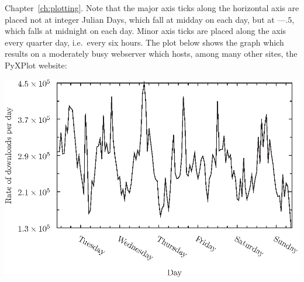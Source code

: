 {Chapter~\ref{ch:plotting}. Note that the major axis ticks along the horizontal
axis are placed not at integer Julian Days, which fall at midday on each day,
but at ---$.5$, which falls at midnight on each day. Minor axis ticks are
placed along the axis every quarter day, i.e.\ every six hours.
\nlscf
{}\newline
{}\newline
{}\newline
{}\newline
{}\newline
{}
\nlscf
The plot below shows the graph which results on a moderately busy webserver
which hosts, among many other sites, the PyXPlot website:
\nlscf
\centerline{\includegraphics[width=\textwidth]{figures/ex_apachelog.eps}}
}

